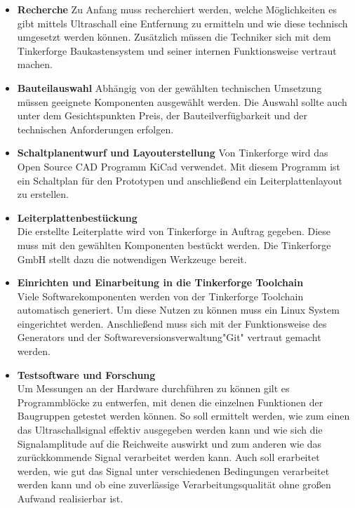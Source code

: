 \begin{itemize}
\item \textbf{Recherche}\newline
Zu  Anfang  muss  recherchiert  werden,  welche  Möglichkeiten  es  gibt  mittels  Ultraschall eine Entfernung zu ermitteln und wie diese technisch umgesetzt werden können. Zusätzlich müssen die Techniker sich mit dem Tinkerforge Baukastensystem und seiner internen Funktionsweise vertraut machen.
\item \textbf{Bauteilauswahl}\newline
Abhängig  von  der  gewählten  technischen  Umsetzung  müssen  geeignete  Komponenten ausgewählt werden. Die Auswahl sollte auch unter dem Gesichtspunkten Preis, der Bauteilverfügbarkeit und der technischen Anforderungen erfolgen.\\
\item \textbf{Schaltplanentwurf und Layouterstellung}\newline
Von  Tinkerforge  wird  das  Open  Source  CAD  Programm  KiCad  verwendet.  Mit diesem Programm ist ein Schaltplan für den Prototypen und anschließend ein Leiterplattenlayout zu erstellen.
\item \textbf{Leiterplattenbestückung}\\
Die erstellte Leiterplatte wird von Tinkerforge in Auftrag gegeben. Diese muss mit den gewählten Komponenten bestückt werden. Die Tinkerforge GmbH stellt dazu die notwendigen Werkzeuge bereit.
\item \textbf{Einrichten und Einarbeitung in die Tinkerforge Toolchain}\\
Viele  Softwarekomponenten  werden  von  der  Tinkerforge  Toolchain  automatisch generiert. Um diese Nutzen zu können muss ein Linux System %
eingerichtet werden. Anschließend muss sich mit der Funktionsweise des Generators und der Softwareversionsverwaltung"Git" vertraut gemacht werden.
\item \textbf{Testsoftware und Forschung}\\
Um Messungen an der Hardware durchführen zu können gilt es Programmblöcke zu entwerfen, mit denen die einzelnen Funktionen der Baugruppen getestet werden können. So soll ermittelt werden, wie zum einen das Ultraschallsignal effektiv ausgegeben werden kann und wie sich die Signalamplitude auf die Reichweite auswirkt und zum anderen wie das zurückkommende Signal verarbeitet werden kann. Auch soll erarbeitet werden, wie gut das Signal unter verschiedenen Bedingungen verarbeitet werden kann und ob eine zuverlässige Verarbeitungsqualität ohne großen Aufwand realisierbar ist.
\end{itemize}
